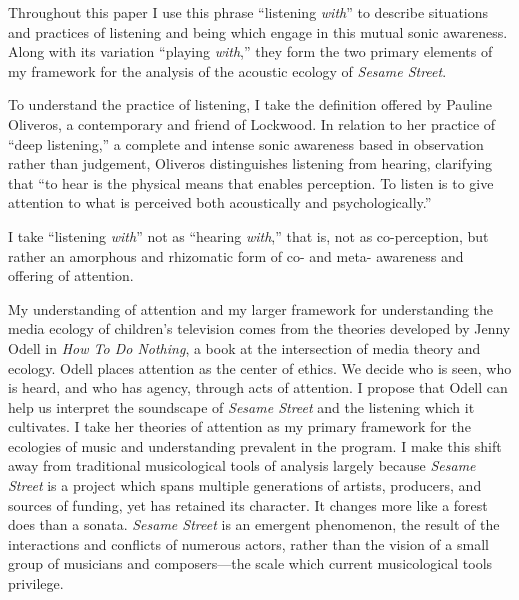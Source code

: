 \documentclass[12pt,letterpaper]{article}
\newcommand{\ses}{\textit{Sesame Street }}
\begin{document}
	Throughout this paper I use this phrase ``listening \textit{with}'' to
	describe situations and practices of listening and being which
	engage in this mutual sonic awareness. Along with its variation 
	``playing \textit{with},'' they form the two primary elements of my
	framework for the analysis of the acoustic ecology of 
	\textit{Sesame Street}. 

	To understand the practice of listening, I take the definition offered 
	by Pauline Oliveros, a contemporary and friend of 
	Lockwood.\autocite[116]{Rodgers} In relation to her practice of ``deep 
	listening,'' a complete and intense sonic awareness based in observation	
  rather than judgement, Oliveros distinguishes listening from hearing, 
	clarifying that ``to hear is the physical means that enables perception.
	To listen is to give attention to what is perceived both acoustically 
	and psychologically.''\autocite[33/366, As things stand today, e-books
	are basically useless for academic research because they lack, of all
	things, page numbers. At its bare-bones, a synthetic work like this
	methodology section is just a long list of page numbers, which makes 
	my reading habbits slightly unhealthy. I'm going to go back and find
	the page numbers in the hard cover edition, but for now, I will list
	them as fractions.]{Odell}  

	I take ``listening \textit{with}'' not as ``hearing \textit{with},'' 
	that is, not as co-perception, but rather an amorphous and rhizomatic
	form of co- and meta- awareness and offering of attention.  

	My understanding of attention and my larger framework for understanding
	the media ecology of children's television comes from the theories 
	developed by Jenny Odell in 
	\textit{How To Do Nothing}, a book at the intersection of media theory
	and ecology. Odell places attention as the center of ethics. We decide 
	who is seen, who is heard, and who has agency, through acts of 
	attention. \autocite[154]{Odell} I propose that Odell can help us 
	interpret the soundscape of \textit{Sesame Street} and the listening
	which it cultivates. I take her theories of attention as my primary
	framework for the ecologies of music and understanding
	prevalent in the program. I make this shift away from traditional
	musicological tools of analysis largely because \ses is a project which
	spans multiple generations of artists, producers, and sources of
	funding, yet has retained its character. It changes more like a forest
	does than a sonata. \ses is an emergent phenomenon, the result of the
	interactions and conflicts of numerous actors, rather than the vision
	of a small group of musicians and composers---the scale which current 
	musicological tools privilege. 
\end{document}
